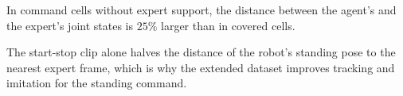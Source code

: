 In command cells without expert support, the distance between the agent's and the expert's joint states is $25\%$ larger than in covered cells.

The start-stop clip alone halves the distance of the robot's standing pose to the nearest expert frame, which is why the extended dataset improves tracking and imitation for the standing command.

